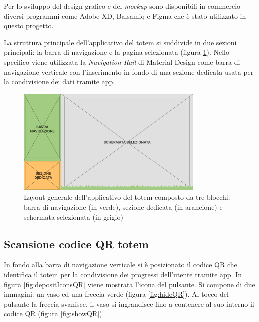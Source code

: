 Per lo sviluppo del design grafico e del \textit{mockup} sono disponibili in commercio diversi programmi come Adobe XD, Balsamiq e Figma che è stato utilizzato in questo progetto.

La struttura principale dell'applicativo del totem si suddivide in due sezioni principali: la barra di navigazione e la pagina selezionata (figura \ref{fig:viewStruct}).
Nello specifico viene utilizzata la \textit{Navigation Rail} di Material Design come barra di navigazione verticale con l'inserimento in fondo di una sezione dedicata usata per la condivisione dei dati tramite app.

\begin{figure} [h]
    \centering
    \includegraphics[width=0.8\textwidth]{img/mainStructure.png}
    \caption{Layout generale dell'applicativo del totem composto da tre blocchi: barra di navigazione (in verde), sezione dedicata (in arancione) e schermata selezionata (in grigio)}
    \label{fig:viewStruct}
\end{figure}

\subsection{Scansione codice QR totem}
In fondo alla barra di navigazione verticale si è posizionato il codice QR che identifica il totem per la condivisione dei progressi dell'utente tramite app.
In figura \ref{fig:depositIconsQR} viene mostrata l'icona del pulsante. Si compone di due immagini: un vaso ed una freccia verde (figura \ref{fig:hideQR}). Al tocco del pulsante la freccia svanisce, il vaso si ingrandisce fino a contenere al suo interno il codice QR (figura \ref{fig:showQR}).

